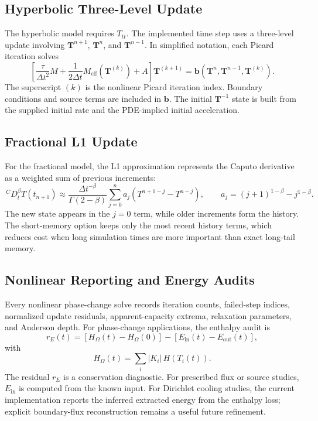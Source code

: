 \documentclass[11pt]{article}
\numberwithin{equation}{section}
\newcommand{\DtCaputo}[2]{\,{}^{C}D_{t}^{#1} #2}
\begin{document}
\subsection{Hyperbolic Three-Level Update}

The hyperbolic model requires $T_{tt}$.  The implemented time step uses a
three-level update involving $\bm{T}^{n+1}$, $\bm{T}^{n}$, and
$\bm{T}^{n-1}$.  In simplified notation, each Picard iteration solves
\begin{equation}
  \left[
    \frac{\tau}{\Delta t^2}M
    + \frac{1}{2\Delta t}M_{\mathrm{eff}}(\bm{T}^{(k)})
    + A
  \right]\bm{T}^{(k+1)}
  =
  \bm{b}(\bm{T}^{n},\bm{T}^{n-1},\bm{T}^{(k)}).
  \label{eq:hyperbolic-linearized-step}
\end{equation}
The superscript $(k)$ is the nonlinear Picard iteration index.  Boundary
conditions and source terms are included in $\bm{b}$.  The initial
$\bm{T}^{-1}$ state is built from the supplied initial rate and the PDE-implied
initial acceleration.

\subsection{Fractional L1 Update}

For the fractional model, the L1 approximation represents the Caputo derivative
as a weighted sum of previous increments:
\begin{equation}
  \DtCaputo{\beta}{T}(t_{n+1})
  \approx
  \frac{\Delta t^{-\beta}}{\Gamma(2-\beta)}
  \sum_{j=0}^{n} a_j
  \left(T^{n+1-j}-T^{n-j}\right),
  \qquad
  a_j = (j+1)^{1-\beta}-j^{1-\beta}.
  \label{eq:l1-scheme}
\end{equation}
The new state appears in the $j=0$ term, while older increments form the
history.  The short-memory option keeps only the most recent history terms,
which reduces cost when long simulation times are more important than exact
long-tail memory.

\subsection{Nonlinear Reporting and Energy Audits}

Every nonlinear phase-change solve records iteration counts, failed-step
indices, normalized update residuals, apparent-capacity extrema, relaxation
parameters, and Anderson depth.  For phase-change applications, the enthalpy
audit is
\begin{equation}
  r_E(t)
  =
  \left[H_\Omega(t)-H_\Omega(0)\right]
  -
  \left[E_{\mathrm{in}}(t)-E_{\mathrm{out}}(t)\right],
  \label{eq:energy-audit}
\end{equation}
with
\begin{equation}
  H_\Omega(t) = \sum_i |K_i|\,H(T_i(t)).
  \label{eq:domain-enthalpy}
\end{equation}
The residual $r_E$ is a conservation diagnostic.  For prescribed flux or source
studies, $E_{\mathrm{in}}$ is computed from the known input.  For Dirichlet
cooling studies, the current implementation reports the inferred extracted
energy from the enthalpy loss; explicit boundary-flux reconstruction remains a
useful future refinement.
\end{document}
